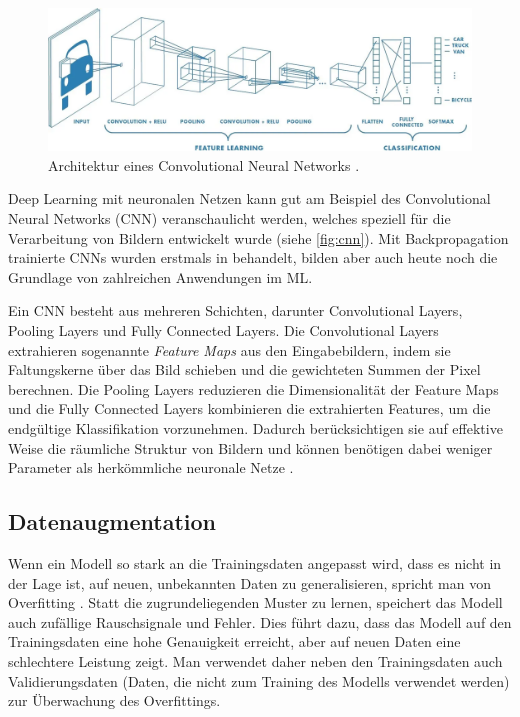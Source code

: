 \begin{figure}[t]
	\centering
	\includegraphics[width=\textwidth]{images/figure_cnn.png}
	\caption[Architektur eines Convolutional Neural Networks.]{Architektur eines Convolutional Neural Networks \parencite{Saha2018cnnfigure}.}
	\label{fig:cnn}
\end{figure}

Deep Learning mit neuronalen Netzen kann gut am Beispiel des Convolutional Neural Networks (CNN) veranschaulicht werden, welches speziell für die Verarbeitung von Bildern entwickelt wurde (siehe \autoref{fig:cnn}). Mit Backpropagation trainierte CNNs wurden erstmals in \parencite{LeCun1989cnnbackprop} behandelt, bilden aber auch heute noch die Grundlage von zahlreichen Anwendungen im ML.

Ein CNN besteht aus mehreren Schichten, darunter Convolutional Layers, Pooling Layers und Fully Connected Layers. Die Convolutional Layers extrahieren sogenannte \emph{Feature Maps} aus den Eingabebildern, indem sie Faltungskerne über das Bild schieben und die gewichteten Summen der Pixel berechnen. Die Pooling Layers reduzieren die Dimensionalität der Feature Maps und die Fully Connected Layers kombinieren die extrahierten Features, um die endgültige Klassifikation vorzunehmen. Dadurch berücksichtigen sie auf effektive Weise die räumliche Struktur von Bildern und können benötigen dabei weniger Parameter als herkömmliche neuronale Netze \parencite{Goodfellow2016deeplearning}.

\subsection{Datenaugmentation} \label{subsec:data-augmentation}

Wenn ein Modell so stark an die Trainingsdaten angepasst wird, dass es nicht in der Lage ist, auf neuen, unbekannten Daten zu generalisieren, spricht man von Overfitting \parencite{Goodfellow2016deeplearning}. Statt die zugrundeliegenden Muster zu lernen, speichert das Modell auch zufällige Rauschsignale und Fehler. Dies führt dazu, dass das Modell auf den Trainingsdaten eine hohe Genauigkeit erreicht, aber auf neuen Daten eine schlechtere Leistung zeigt. Man verwendet daher neben den Trainingsdaten auch Validierungsdaten (Daten, die nicht zum Training des Modells verwendet werden) zur Überwachung des Overfittings.

